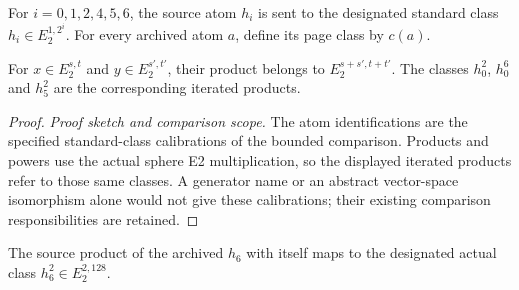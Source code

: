 \begin{theorem}
\label{sem:Computation:standard-atoms}
For $i=0,1,2,4,5,6$, the source atom $h_i$ is sent to the designated standard class $h_i\in E_2^{1,2^i}$. For every archived atom $a$, define its page class by $c(a)$.

For $x\in E_2^{s,t}$ and $y\in E_2^{s\prime,t\prime}$, their product belongs to $E_2^{s+s\prime,t+t\prime}$. The classes $h_0^2$, $h_0^6$ and $h_5^2$ are the corresponding iterated products.
\end{theorem}
\begin{proof}
\textit{Proof sketch and comparison scope.}
The atom identifications are the specified standard-class calibrations
of the bounded comparison. Products and powers use the actual sphere
E2 multiplication, so the displayed iterated products refer to those
same classes. A generator name or an abstract vector-space isomorphism
alone would not give these calibrations; their existing comparison
responsibilities are retained.
\end{proof}


\begin{theorem}[Calibration of the Kervaire class]
\label{sem:Computation:h6-square-calibration}
The source product of the archived $h_6$ with itself maps to the designated actual class $h_6^2\in E_2^{2,128}$.
\end{theorem}

